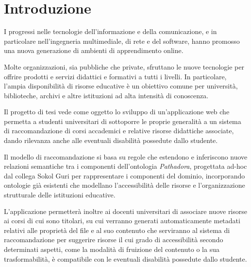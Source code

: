 %
\chapter*{Introduzione}                 %

I progressi nelle tecnologie dell'informazione e della comunicazione, e in particolare nell'ingegneria multimediale, di rete e del software, hanno promosso una nuova generazione di ambienti di apprendimento online.

Molte organizzazioni, sia pubbliche che private, sfruttano le nuove tecnologie per offrire prodotti e servizi didattici e formativi a tutti i livelli. In particolare, l'ampia disponibilità di risorse educative è un obiettivo comune per università, biblioteche, archivi e altre istituzioni ad alta intensità di conoscenza.

\vspace{5mm}

Il progetto di tesi vede come oggetto lo sviluppo di un'applicazione web che permetta a studenti universitari di sottoporre le proprie generalità a un sistema di raccomandazione di corsi accademici e relative risorse didattiche associate, dando rilevanza anche alle eventuali disabilità possedute dallo studente.

Il modello di raccomandazione si basa su regole che estendono e inferiscono nuove relazioni semantiche tra i componenti dell'ontologia \textit{Pathadora}, progettata ad-hoc dal collega Sokol Guri per rappresentare i componenti del dominio, incorporando ontologie già esistenti che modellano l'accessibilità delle risorse e l’organizzazione strutturale delle istituzioni educative. 

\vspace{5mm}

L'applicazione permetterà inoltre ai docenti universitari di associare nuove risorse ai corsi di cui sono titolari, su cui verranno generati automaticamente metadati relativi alle proprietà del file e al suo contenuto che serviranno al sistema di raccomandazione per suggerire risorse il cui grado di accessibilità secondo determinati aspetti, come la modalità di fruizione del contenuto o la sua trasformabilità, è compatibile con le eventuali disabilità possedute dallo studente.

